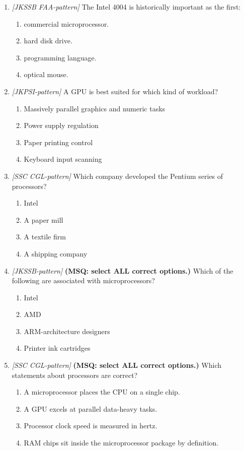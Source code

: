 \documentclass[11pt]{article}
\begin{document}
\begin{enumerate}[label=\textbf{Q\arabic*.}, leftmargin=*]
\item \textit{[JKSSB FAA-pattern]} The Intel 4004 is historically important as the first:
  \begin{enumerate}[label=\Alph*.]
    \item commercial microprocessor.
    \item hard disk drive.
    \item programming language.
    \item optical mouse.
  \end{enumerate}
\item \textit{[JKPSI-pattern]} A GPU is best suited for which kind of workload?
  \begin{enumerate}[label=\Alph*.]
    \item Massively parallel graphics and numeric tasks
    \item Power supply regulation
    \item Paper printing control
    \item Keyboard input scanning
  \end{enumerate}
\item \textit{[SSC CGL-pattern]} Which company developed the Pentium series of processors?
  \begin{enumerate}[label=\Alph*.]
    \item Intel
    \item A paper mill
    \item A textile firm
    \item A shipping company
  \end{enumerate}
\item \textit{[JKSSB-pattern]} \textbf{(MSQ: select ALL correct options.)} Which of the following are associated with microprocessors?
  \begin{enumerate}[label=\Alph*.]
    \item Intel
    \item AMD
    \item ARM-architecture designers
    \item Printer ink cartridges
  \end{enumerate}
\item \textit{[SSC CGL-pattern]} \textbf{(MSQ: select ALL correct options.)} Which statements about processors are correct?
  \begin{enumerate}[label=\Alph*.]
    \item A microprocessor places the CPU on a single chip.
    \item A GPU excels at parallel data-heavy tasks.
    \item Processor clock speed is measured in hertz.
    \item RAM chips sit inside the microprocessor package by definition.
  \end{enumerate}
\end{enumerate}
\def\JKSSBLessonID{6}\def\JKSSBAnswers{0}
\end{document}
